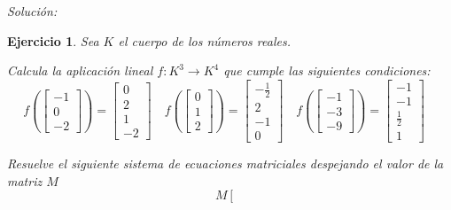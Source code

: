\documentclass[12pt]{amsart}
\newtheorem{ejer}{Ejercicio}
\begin{document}
{\it Soluci\'on:}



\begin{ejer} Sea $K$ el cuerpo de los n\'umeros reales.
\newline
\noindent\begin{minipage}{\textwidth}
\begin{tcolorbox}[colback = green!20!white,title=Versión Aplicación]
Calcula la aplicaci\'on lineal $f:K^{3} \to K^{4}$ que cumple las siguientes condiciones: 
\[f\left(\left[\begin{array}{r}
-1 \\
0 \\
-2
\end{array}\right]\right) = \left[\begin{array}{r}
0 \\
2 \\
1 \\
-2
\end{array}\right] \quad f\left(\left[\begin{array}{r}
0 \\
1 \\
2
\end{array}\right]\right) = \left[\begin{array}{r}
-\frac{1}{2} \\
2 \\
-1 \\
0
\end{array}\right] \quad f\left(\left[\begin{array}{r}
-1 \\
-3 \\
-9
\end{array}\right]\right) = \left[\begin{array}{r}
-1 \\
-1 \\
\frac{1}{2} \\
1
\end{array}\right] \quad 
\]\end{tcolorbox}
\end{minipage} \newline
\noindent\begin{minipage}{\textwidth}
\begin{tcolorbox}[colback = blue!20!white,title=Versión Sistema Matricial]
Resuelve el siguiente sistema de ecuaciones matriciales despejando el valor de la matriz $M$
\[M \left[\begin{array}{r}

\end{array}\]
\end{tcolorbox}
\end{minipage}
\end{ejer}
\end{document}
